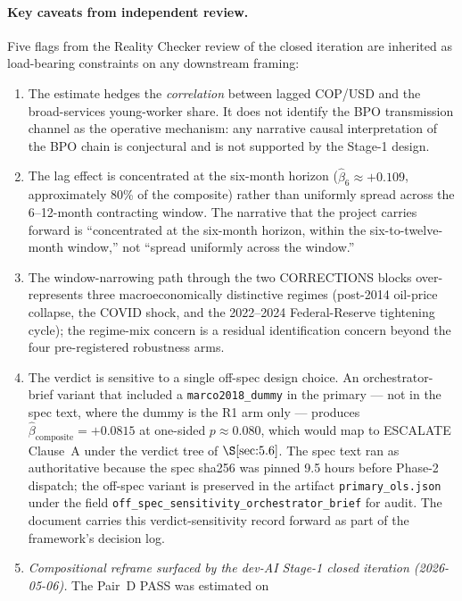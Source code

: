 \paragraph{Key caveats from independent review.} Five flags from the
Reality Checker review of the closed iteration are inherited as
load-bearing constraints on any downstream framing:
\begin{enumerate}
  \item The estimate hedges the \emph{correlation} between lagged COP/USD
    and the broad-services young-worker share. It does not identify the
    BPO transmission channel as the operative mechanism: any narrative
    causal interpretation of the BPO chain is conjectural and is not
    supported by the Stage-1 design.
  \item The lag effect is concentrated at the six-month horizon
    (\(\hat{\beta}_6 \approx +0.109\), approximately 80\% of the
    composite) rather than uniformly spread across the 6--12-month
    contracting window. The narrative that the project carries forward
    is ``concentrated at the six-month horizon, within the
    six-to-twelve-month window,'' not ``spread uniformly across
    the window.''
  \item The window-narrowing path through the two CORRECTIONS blocks
    over-represents three macroeconomically distinctive regimes
    (post-2014 oil-price collapse, the COVID shock, and the 2022--2024
    Federal-Reserve tightening cycle); the regime-mix concern is
    a residual identification concern beyond the four pre-registered
    robustness arms.
  \item The verdict is sensitive to a single off-spec design choice. An
    orchestrator-brief variant that included a \texttt{marco2018\_dummy}
    in the primary --- not in the spec text, where the dummy is the R1
    arm only --- produces \(\hat{\beta}_{\mathrm{composite}} = +0.0815\)
    at one-sided \(p \approx 0.080\), which would map to ESCALATE
    Clause~A under the verdict tree of \(\S\ref{sec:5.6}\). The spec
    text ran as authoritative because the spec sha256 was pinned
    9.5 hours before Phase-2 dispatch; the off-spec variant is preserved
    in the artifact \texttt{primary\_ols.json} under the field
    \texttt{off\_spec\_sensitivity\_orchestrator\_brief} for audit. The
    document carries this verdict-sensitivity record forward as part of
    the framework's decision log.
  \item \emph{Compositional reframe surfaced by the dev-AI Stage-1
    closed iteration (2026-05-06).} The Pair~D PASS was estimated on

\end{enumerate}
